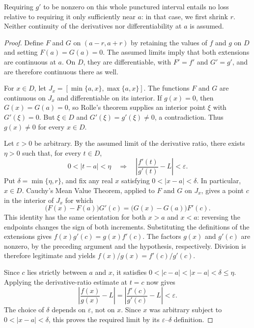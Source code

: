 \documentclass{essay}
\begin{document}
Requiring \(g'\) to be nonzero on this whole punctured interval entails no
loss relative to requiring it only sufficiently near \(a\): in that case,
we first shrink \(r\). Neither continuity of the derivatives nor
differentiability at \(a\) is assumed.

\begin{proof}
  Define \(F\) and \(G\) on \((a-r,a+r)\) by retaining the values of \(f\) and \(g\)
  on \(D\) and setting \(F(a)=G(a)=0\). The assumed limits imply that both
  extensions are continuous at \(a\). On \(D\), they are differentiable, with
  \(F'=f'\) and \(G'=g'\), and are therefore continuous there as well.

  For \(x\in D\), let \(J_{x}=[\min\{a,x\},\max\{a,x\}]\). The functions \(F\)
  and \(G\) are continuous on \(J_{x}\) and differentiable on its interior.
  If \(g(x)=0\), then \(G(x)=G(a)=0\), so Rolle's theorem supplies an interior
  point \(\xi\) with \(G'(\xi)=0\). But \(\xi\in D\) and
  \(G'(\xi)=g'(\xi)\ne0\), a contradiction. Thus \(g(x)\ne0\) for every
  \(x\in D\).

  Let \(\varepsilon>0\) be arbitrary. By the assumed limit of the derivative
  ratio, there exists \(\eta>0\) such that, for every \(t\in D\),
  \[ 0<|t-a|<\eta \quad\Longrightarrow\quad \left|\frac{f'(t)}{g'(t)}-L\right|<\varepsilon. \]
  Put \(\delta=\min\{\eta,r\}\), and fix any real \(x\) satisfying
  \(0<|x-a|<\delta\). In particular, \(x\in D\). Cauchy's Mean Value Theorem,
  applied to \(F\) and \(G\) on \(J_{x}\), gives a point \(c\) in the interior of
  \(J_{x}\) for which
  \[ \bigl(F(x)-F(a)\bigr)G'(c) =\bigl(G(x)-G(a)\bigr)F'(c). \]
  This identity has the same orientation for both \(x>a\) and \(x<a\): reversing
  the endpoints changes the sign of both increments. Substituting the
  definitions of the extensions gives \(f(x)g'(c)=g(x)f'(c)\). The factors
  \(g(x)\) and \(g'(c)\) are nonzero, by the preceding argument and the
  hypothesis, respectively. Division is therefore legitimate and yields
  \(f(x)/g(x)=f'(c)/g'(c)\).

  Since \(c\) lies strictly between \(a\) and \(x\), it satisfies
  \(0<|c-a|<|x-a|<\delta\le\eta\). Applying the derivative-ratio estimate
  at \(t=c\) now gives
  \[ \left|\frac{f(x)}{g(x)}-L\right| =\left|\frac{f'(c)}{g'(c)}-L\right| <\varepsilon. \]
  The choice of \(\delta\) depends on \(\varepsilon\), not on \(x\). Since \(x\)
  was arbitrary subject to \(0<|x-a|<\delta\), this proves the required
  limit by its \(\varepsilon\)--\(\delta\) definition.
\end{proof}
\end{document}
